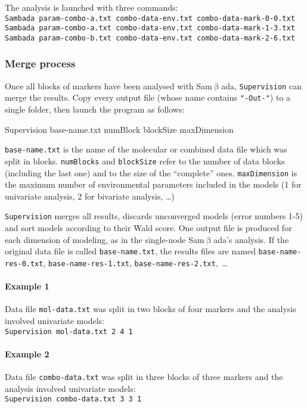 \documentclass[a4paper,11pt]{article}
\newcommand{\smb}{\textsf{Sam$\upbeta$ada}}
\newcommand{\prog}[1]{\texttt{#1}}
\newenvironment{launch}{\begin{mdframed}\ttfamily}{\end{mdframed}}
\begin{document}
The analysis is launched with three commands:\\
\verb+Sambada param-combo-a.txt combo-data-env.txt combo-data-mark-0-0.txt+\\
\verb+Sambada param-combo-a.txt combo-data-env.txt combo-data-mark-1-3.txt +\\
\verb+Sambada param-combo-b.txt combo-data-env.txt combo-data-mark-2-6.txt+\\


\subsubsection{Merge process}
Once all blocks of markers have been analysed with \smb, \prog{Supervision} can merge the results.
Copy every output file (whose name contains \prog{"-Out-"}) to a single folder, then launch the program as follows:
\begin{launch}
Supervision base-name.txt numBlock blockSize maxDimension
\end{launch}
\verb+base-name.txt+ is the name of the molecular or combined data file which was split in blocks.
\verb+numBlocks+ and \verb+blockSize+ refer to the number of data blocks (including the last one) and to the size of the \enquote{complete} ones.
\verb+maxDimension+ is the maximum number of environmental parameters included in the models (1 for univariate analysis, 2 for bivariate analysis, \dots)

\prog{Supervision} merges all results, discards unconverged models (error numbers 1-5) and sort models according to their Wald score.
One output file is produced for each dimension of modeling, as in the single-node \smb's analysis.
If the original data file is called \verb+base-name.txt+, the results files are named \verb+base-name-res-0.txt+, \verb+base-name-res-1.txt+, \verb+base-name-res-2.txt+,~\dots

\paragraph{Example 1}
Data file \verb+mol-data.txt+ was split in two blocks of four markers and the analysis involved univariate models:\\
 \verb+Supervision mol-data.txt 2 4 1+\\

\paragraph{Example 2}
Data file \verb+combo-data.txt+ was split in three blocks of three markers and the analysis involved univariate models:\\
 \verb+Supervision combo-data.txt 3 3 1+\\
 
\end{document}

